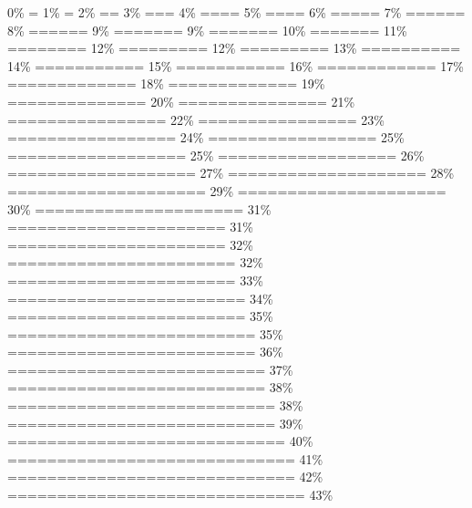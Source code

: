 \documentclass[
]{article}
\begin{document}
\textbar{} \textbar{} \textbar{} 0\% \textbar{} \textbar= \textbar{} 1\%
\textbar{} \textbar= \textbar{} 2\% \textbar{} \textbar== \textbar{} 3\%
\textbar{} \textbar=== \textbar{} 4\% \textbar{} \textbar==== \textbar{}
5\% \textbar{} \textbar==== \textbar{} 6\% \textbar{} \textbar=====
\textbar{} 7\% \textbar{} \textbar====== \textbar{} 8\% \textbar{}
\textbar====== \textbar{} 9\% \textbar{} \textbar======= \textbar{} 9\%
\textbar{} \textbar======= \textbar{} 10\% \textbar{} \textbar=======
\textbar{} 11\% \textbar{} \textbar======== \textbar{} 12\% \textbar{}
\textbar========= \textbar{} 12\% \textbar{} \textbar=========
\textbar{} 13\% \textbar{} \textbar========== \textbar{} 14\% \textbar{}
\textbar=========== \textbar{} 15\% \textbar{} \textbar===========
\textbar{} 16\% \textbar{} \textbar============ \textbar{} 17\%
\textbar{} \textbar============= \textbar{} 18\% \textbar{}
\textbar============= \textbar{} 19\% \textbar{} \textbar==============
\textbar{} 20\% \textbar{} \textbar=============== \textbar{} 21\%
\textbar{} \textbar================ \textbar{} 22\% \textbar{}
\textbar================ \textbar{} 23\% \textbar{}
\textbar================= \textbar{} 24\% \textbar{}
\textbar================= \textbar{} 25\% \textbar{}
\textbar================== \textbar{} 25\% \textbar{}
\textbar================== \textbar{} 26\% \textbar{}
\textbar=================== \textbar{} 27\% \textbar{}
\textbar==================== \textbar{} 28\% \textbar{}
\textbar==================== \textbar{} 29\% \textbar{}
\textbar===================== \textbar{} 30\% \textbar{}
\textbar===================== \textbar{} 31\% \textbar{}
\textbar====================== \textbar{} 31\% \textbar{}
\textbar====================== \textbar{} 32\% \textbar{}
\textbar======================= \textbar{} 32\% \textbar{}
\textbar======================= \textbar{} 33\% \textbar{}
\textbar======================== \textbar{} 34\% \textbar{}
\textbar======================== \textbar{} 35\% \textbar{}
\textbar========================= \textbar{} 35\% \textbar{}
\textbar========================= \textbar{} 36\% \textbar{}
\textbar========================== \textbar{} 37\% \textbar{}
\textbar========================== \textbar{} 38\% \textbar{}
\textbar=========================== \textbar{} 38\% \textbar{}
\textbar=========================== \textbar{} 39\% \textbar{}
\textbar============================ \textbar{} 40\% \textbar{}
\textbar============================= \textbar{} 41\% \textbar{}
\textbar============================= \textbar{} 42\% \textbar{}
\textbar============================== \textbar{} 43\% \textbar{}
\end{document}
